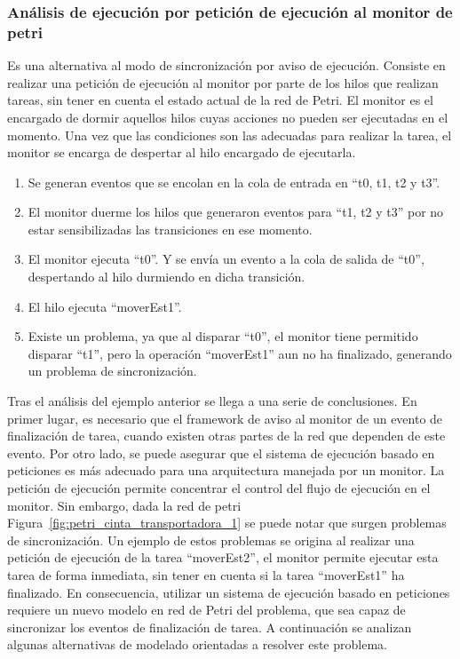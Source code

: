 \subsubsection{Análisis de ejecución por petición de ejecución al monitor de
petri}
\label{sec:sincronizacion_peticion_ejecucion}
 Es una alternativa al modo de sincronización por aviso de ejecución. Consiste
 en realizar una petición de ejecución al monitor por parte de los hilos que
 realizan tareas, sin tener en cuenta el estado actual de la red de Petri.
 El monitor es el encargado de dormir aquellos hilos cuyas acciones no
 pueden ser ejecutadas en el momento. Una vez que las condiciones son las
 adecuadas para realizar la tarea, el monitor se encarga de despertar al hilo
 encargado de ejecutarla.
\begin{enumerate}
    \item Se generan eventos que se encolan en la cola de entrada en “t0, t1,
    	t2 y t3”.
    \item El monitor duerme los hilos que generaron eventos para “t1, t2 y t3”
    	por no estar sensibilizadas las transiciones en ese momento.
    \item El monitor ejecuta “t0”. Y se envía un evento a la cola de salida de
    	“t0”, despertando al hilo durmiendo en dicha transición.
    \item El hilo ejecuta “moverEst1”.
    \item Existe un problema, ya que al disparar “t0”, el monitor tiene
    	permitido disparar “t1”, pero la operación “moverEst1” aun no ha
    	finalizado, generando un problema de sincronización.
\end{enumerate}
Tras el análisis  del ejemplo anterior se llega a una serie de
conclusiones. En primer lugar, es necesario que el framework de aviso al monitor
de un evento de finalización de tarea, cuando existen otras partes de la red que
dependen de este evento.
Por otro lado, se puede asegurar que el sistema de ejecución basado en
peticiones es más adecuado para una arquitectura manejada por un monitor. La
petición de ejecución permite concentrar el control del flujo de ejecución en
el monitor.
Sin embargo, dada la red de petri
Figura~\ref{fig:petri_cinta_transportadora_1} se puede notar que surgen
problemas de sincronización. Un ejemplo de estos problemas se origina al
realizar una petición de ejecución de la tarea “moverEst2”, el monitor permite
ejecutar esta tarea de forma inmediata, sin tener en cuenta si la tarea
``moverEst1'' ha finalizado. En consecuencia, utilizar un sistema de ejecución
basado en peticiones requiere un nuevo modelo en red de Petri del problema, que
sea capaz de sincronizar los eventos de finalización de tarea.
A continuación se analizan algunas alternativas de modelado orientadas a
resolver este problema.

